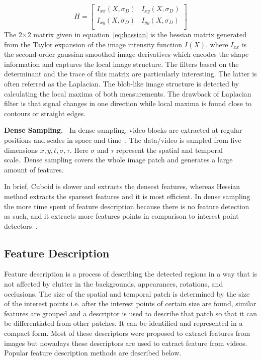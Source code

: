 \begin{equation}
	 H = 
	\begin{bmatrix}
	I_{xx}(X, \sigma_D)&I_{xy}(X, \sigma_D)\\
	I_{xy}(X, \sigma_D)&I_{yy}(X, \sigma_D)\\
	\end{bmatrix}
	\label{eq:hassian}
\end{equation}
The 2$\times$2 matrix given in equation~\ref{eq:hassian} is the hessian matrix generated from the Taylor expansion of the image intensity function $I(X)$. where $I_{xx}$ is the second-order gaussian smoothed image derivatives which encodes the shape information and captures the local image structure. 
The filters based on the determinant and the trace of this matrix are particularly interesting. The latter is often referred as the Laplacian. The blob-like image structure is detected by calculating the local maxima of both measurements. The drawback of Laplacian filter is that signal changes in one direction while local maxima is found close to contours or straight edges.%

\noindent
\textbf{Dense Sampling.~}
In dense sampling, video blocks are extracted at regular positions and scales in space and time~\cite{6233178}. The data/video is sampled from five dimensions $x, y, t, \sigma,  \tau$.   Here $\sigma$  and $\tau$   represent the spatial and temporal scale.\ Dense sampling covers the whole image patch and generates a large amount of features.%

In brief, Cuboid is slower and extracts the densest features, whereas Hessian method extracts the sparsest features and it is most efficient. In dense sampling the more time spent of feature description because there is no feature detection as such, and it extracts more features points in comparison to interest point detectors~\cite{wang2009evaluation}.
\subsection{Feature Description}
Feature description is a process of describing the detected regions in a way that is not affected by clutter in the backgrounds, appearances, rotations, and occlusions. The size of the spatial and temporal patch is determined by the size of the interest points i.e. after the interest points of certain size are found, similar features are grouped and a descriptor is used to describe that patch so that it can be differentiated from other patches. It can be identified and represented in a compact form. Most of these descriptors were proposed to extract features from images but nowadays these descriptors are used to extract feature from videos. Popular feature description methods are described below. %

